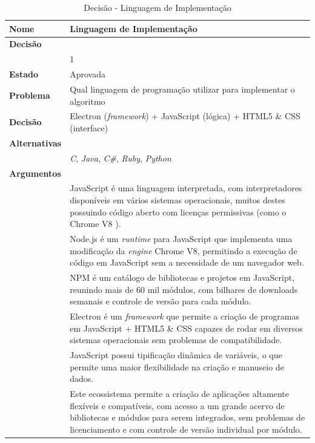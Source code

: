 \documentclass[12pt]{article}
\begin{document}
\begin{table}[H]
	\centering
	\caption{Decisão - Linguagem de Implementação}
	\begin{tabular}{p{3cm} p{11cm}}
		\textbf{Nome}		&	Linguagem de Implementação \\
		\toprule
		\textbf{Decisão}	&   \\
							& 1 \\
		\toprule
		\midrule
		\textbf{Estado}		& Aprovada \\
		\midrule
		\textbf{Problema}	& Qual linguagem de programação utilizar para implementar o algoritmo\\
		\midrule
		\textbf{Decisão}	& Electron (\textit{framework}) + JavaScript (lógica)
							  + HTML5 \& CSS (interface)\\
		\midrule
		\textbf{Alternativas} & \\
		& \textit{C}, \textit{Java}, \textit{C\#}, \textit{Ruby}, \textit{Python} \\
		\midrule
		\textbf{Argumentos} & \\
		& JavaScript é uma linguagem interpretada, com interpretadores disponíveis em vários
		  sistemas operacionais, muitos destes possuindo código aberto com licenças permissivas
		  (como o Chrome V8 \cite{ChromeV8}).\\
		& Node.js \cite{Node.js} é um \textit{runtime} para JavaScript que implementa uma
		  modificação da \textit{engine} Chrome V8, permitindo a execução de código em JavaScript
		  sem a necessidade de um navegador web.\\
		& NPM \cite{NPM} é um catálogo de bibliotecas e projetos em JavaScript, reunindo mais
		  de 60 mil módulos, com bilhares de downloads semanais \cite{NPMWeekly:18} e controle
		  de versão para cada módulo.\\
		& Electron \cite{ElectronJS} é um \textit{framework} que permite a criação de programas
		  em JavaScript + HTML5 \& CSS capazes de rodar em diversos sistemas operacionais 
		  sem problemas de compatibilidade.\\
		& JavaScript possui tipificação dinâmica de variáveis, o que permite uma maior
		  flexibilidade na criação e manuseio de dados.\\
		& Este ecossistema permite a criação de aplicações altamente flexíveis e compatíveis,
		  com acesso a um grande acervo de bibliotecas e módulos para serem integrados,
		  sem problemas de licenciamento e com controle de versão individual por módulo.\\
		\bottomrule
	\end{tabular}		
\end{table}
\end{document}
